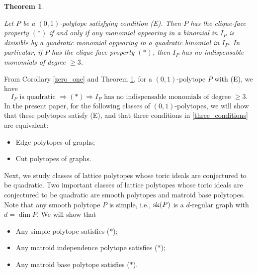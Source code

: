 \documentclass[12pt]{amsart}
\newtheorem{thm}{Theorem} [section]
\theoremstyle{definition}
\numberwithin{thm}{section}
\numberwithin{equation}{section}
\begin{document}
\begin{thm}\label{indispensable}

Let \(P\) be a \((0,1)\)-polytope satisfying condition (E).
Then \(P\) has the clique-face property \((*)\) if and only if
any monomial appearing in a binomial in \(I_P\) is divisible by
a quadratic monomial appearing in a quadratic binomial in \(I_P\).
In particular, if \(P\) has the clique-face property \((*)\), then
\(I_P\) has no indispensable monomials of degree \(\ge 3\).
\end{thm}

From Corollary \ref{zero_one} and Theorem \ref{indispensable}, for a $(0,1)$-polytope $P$ with (E), we have 
\begin{equation} \label{three_conditions}
    I_P \mbox{ is quadratic } \Rightarrow
(*)
\Rightarrow
I_P \mbox{ has no indispensable monomials of degree } \ge 3.  
\end{equation}
In the present paper,
for the following classes of $(0,1)$-polytopes,
we will show that 
these polytopes satisfy (E), and that
three conditions in \eqref{three_conditions} are equivalent:
\begin{itemize}
    \item 
    Edge polytopes of graphs;

    \item 
    Cut polytopes of graphs.
   
\end{itemize}
Next, we study classes of lattice polytopes whose toric ideals are conjectured to be quadratic.
Two important classes of lattice polytopes whose toric ideals are conjectured to be quadratic are smooth polytopes and matroid base polytopes.
Note that any smooth polytope $P$ is simple, i.e., 
${\rm sk}(P)$ is a $d$-regular graph with $d = \dim P$.
We will show that
\begin{itemize}
    \item 
    Any simple polytope satisfies ($*$);

    \item 
    Any matroid independence polytope satisfies ($*$);

        \item 
    Any matroid base polytope satisfies ($*$).
\end{itemize}
\end{document}
